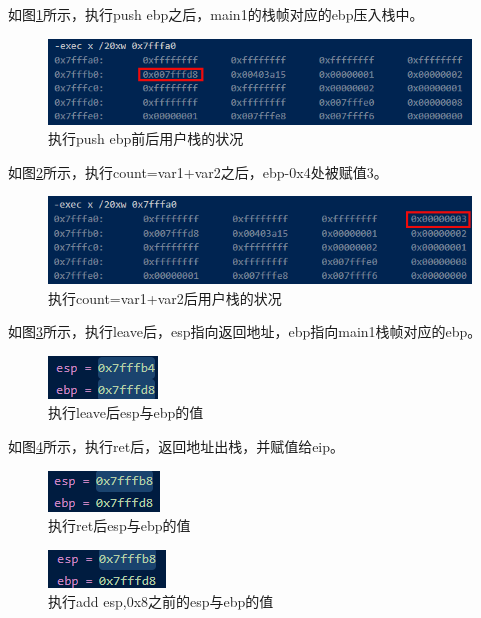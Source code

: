 如图\ref{afterPush}所示，执行push ebp之后，main1的栈帧对应的ebp压入栈中。

\begin{figure}[!htbp]
    \centering
    \includegraphics[scale=1]{figures/afterPush.png}
    \caption{执行push ebp前后用户栈的状况}\label{afterPush}
\end{figure}

如图\ref{afterAdd}所示，执行count=var1+var2之后，ebp-0x4处被赋值3。


\begin{figure}[!htbp]
    \centering
    \includegraphics[scale=1]{figures/afterAdd.png}
    \caption{执行count=var1+var2后用户栈的状况}\label{afterAdd}
\end{figure}

如图\ref{afterLeave}所示，执行leave后，esp指向返回地址，ebp指向main1栈帧对应的ebp。

\begin{figure}[!htbp]
    \centering
    \includegraphics[scale=1]{figures/afterLeave.png}
    \caption{执行leave后esp与ebp的值}\label{afterLeave}
\end{figure}

如图\ref{afterRet}所示，执行ret后，返回地址出栈，并赋值给eip。

\begin{figure}[!htbp]
    \centering
    \includegraphics[scale=1]{figures/afterRet.png}
    \caption{执行ret后esp与ebp的值}\label{afterRet}
\end{figure}

\begin{figure}[!htbp]
    \centering
    \includegraphics[scale=1]{figures/beforeAddESP.png}
    \caption{执行add esp,0x8之前的esp与ebp的值}\label{beforeAddESP}
\end{figure}

